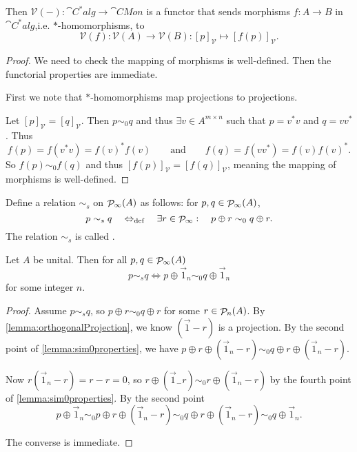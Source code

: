 \begin{lemma}
Then $\mathcal{V}(-): \cat{C^*alg} \to \cat{CMon}$ is a functor that sends morphisms $f: A \to B$ in $\cat{C^*alg}$,i.e. $*$-homomorphisms, to
\[  \mathcal{V}(f):\mathcal{V}(A) \to \mathcal{V}(B): [p]_\mathcal{V} \mapsto [f(p)]_\mathcal{V}. \]
\end{lemma}
\begin{proof}
We need to check the mapping of morphisms is well-defined. Then the functorial properties are immediate.

First we note that $*$-homomorphisms map projections to projections.

Let $[p]_\mathcal{V} = [q]_\mathcal{V}$. Then $p\sim_0 q$ and thus $\exists v\in A^{m\times n}$ such that $p=v^*v$ and $q = vv^*$. Thus
\[ f(p) = f(v^*v) = f(v)^*f(v) \qquad \text{and}\qquad f(q) = f(vv^*) = f(v)f(v)^*. \]
So $f(p) \sim_0 f(q)$ and thus $[f(p)]_\mathcal{V} = [f(q)]_\mathcal{V}$, meaning the mapping of morphisms is well-defined.
\end{proof}

\begin{definition}
Define a relation $\sim_s$ on $\mathop{\mathcal{P}}\nolimits_\infty(A)$ as follows: for $p,q\in\mathop{\mathcal{P}}\nolimits_\infty(A)$,
\[ p\sim_s q \quad\Leftrightarrow_{\text{def}}\quad \exists r\in\mathop{\mathcal{P}}\nolimits_\infty:\quad p\oplus r \sim_0 q\oplus r. \]
The relation $\sim_s$ is called .
\end{definition}

\begin{lemma} \label{lemma:stableEquivalence}
Let $A$ be unital. Then for all $p,q\in\mathop{\mathcal{P}}\nolimits_\infty(A)$
\[ p\sim_s q \iff p\oplus \vec{1}_n \sim_0 q\oplus \vec{1}_n \]
for some integer $n$.
\end{lemma}
\begin{proof}
Assume $ p\sim_s q$, so $p\oplus r \sim_0 q\oplus r$ for some $r\in\mathop{\mathcal{P}}\nolimits_n(A)$. By \ref{lemma:orthogonalProjection}, we know $(\vec{1}-r)$ is a projection. By the second point of \ref{lemma:sim0properties}, we have $p\oplus r \oplus (\vec{1}_n - r) \sim_0 q\oplus r \oplus (\vec{1}_n - r)$.

Now $r(\vec{1}_n - r) = r-r = 0$, so $r\oplus(\vec{1}_ - r) \sim_0 r\oplus(\vec{1}_n - r)$ by the fourth point of \ref{lemma:sim0properties}. By the second point
\[ p\oplus \vec{1}_n \sim_0 p\oplus r \oplus (\vec{1}_n - r) \sim_0 q\oplus r \oplus (\vec{1}_n - r) \sim_0 q\oplus \vec{1}_n. \]

The converse is immediate.
\end{proof}

